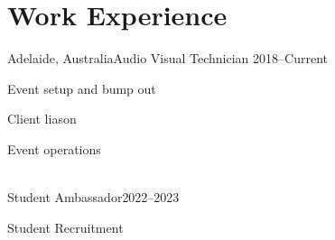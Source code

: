 \section{Work Experience}
	{Adelaide, Australia}{Audio Visual Technician}
	{2018--Current}{
    \item[\textbf{--}] Event setup and bump out
    \item[\textbf{--}] Client liason
    \item[\textbf{--}] Event operations
}\vspace{0.1cm}
\\
	{Student Ambassador}{2022--2023}{
    \item[\textbf{--}] Student Recruitment
}
